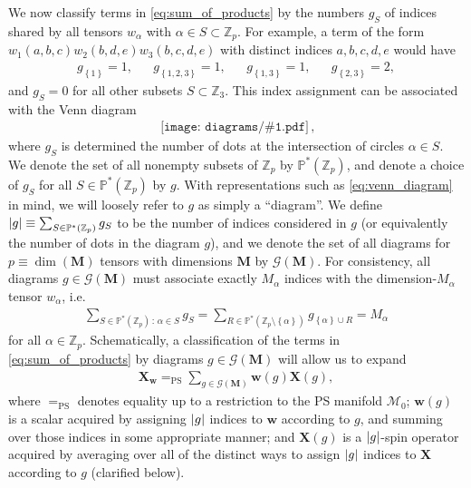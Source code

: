 \documentclass[nofootinbib,notitlepage,11pt]{revtex4-2}
\newcommand{\p}[1]{\left(#1\right)} %
\renewcommand{\set}[1]{\left\{#1\right\}} %
\newcommand{\m}{\bm} %
\newcommand{\1}{\mathds{1}}
\newcommand{\G}{\mathcal{G}}
\newcommand{\M}{\mathcal{M}}
\newcommand{\PP}{\mathbb{P}}
\newcommand{\ZZ}{\mathbb{Z}}
\newcommand{\EQPS}{=_{\text{PS}}}
\newcommand{\diagram}[1]
{\,\texttt{[image: diagrams/\#1.pdf]}\,}
\begin{document}
We now classify terms in \eqref{eq:sum_of_products} by the numbers
$g_S$ of indices shared by all tensors $w_\alpha$ with
$\alpha\in S\subset\ZZ_p$.  For example, a term of the form
$w_1\p{a,b,c} w_2\p{b,d,e} w_3\p{b,c,d,e}$ with distinct indices
$a,b,c,d,e$ would have
\begin{align}
  g_{\set{1}} = 1,
  &&
  g_{\set{1,2,3}} = 1,
  &&
  g_{\set{1,3}} = 1,
  &&
  g_{\set{2,3}} = 2,
\end{align}
and $g_S=0$ for all other subsets $S\subset\ZZ_3$.  This index
assignment can be associated with the Venn diagram
\begin{align}
  \diagram{example_123},
  \label{eq:venn_diagram}
\end{align}
where $g_S$ is determined the number of dots at the intersection of
circles $\alpha\in S$.  We denote the set of all nonempty subsets of
$\ZZ_p$ by $\PP^*\p{\ZZ_p}$, and denote a choice of $g_S$ for all
$S\in\PP^*\p{\ZZ_p}$ by $g$.  With representations such as
\eqref{eq:venn_diagram} in mind, we will loosely refer to $g$ as
simply a ``diagram''.  We define
$\abs{g}\equiv\sum_{S\in\PP^*\p{\ZZ_p}}g_S$ to be the number of
indices considered in $g$ (or equivalently the number of dots in the
diagram $g$), and we denote the set of all diagrams for
$p\equiv\dim\p{\m M}$ tensors with dimensions $\m M$ by $\G\p{\m M}$.
For consistency, all diagrams $g\in\G\p{\m M}$ must associate exactly
$M_\alpha$ indices with the dimension-$M_\alpha$ tensor $w_\alpha$,
i.e.
\begin{align}
  \sum_{S\in\PP^*\p{\ZZ_p}\,:\,\alpha\in S} g_S
  = \sum_{R\in\PP^*\p{\ZZ_p\setminus\set{\alpha}}} g_{\set{\alpha}\cup R}
  = M_\alpha
\end{align}
for all $\alpha\in\ZZ_p$.  Schematically, a classification of the
terms in \eqref{eq:sum_of_products} by diagrams $g\in\G\p{\m M}$ will
allow us to expand
\begin{align}
  \m X_{\m w} \EQPS \sum_{g\in\G\p{\m M}} \m w\p{g} \m X\p{g},
  \label{eq:sym_prod_teaser}
\end{align}
where $\EQPS$ denotes equality up to a restriction to the PS manifold
$\M_0$; $\m w\p{g}$ is a scalar acquired by assigning $\abs{g}$
indices to $\m w$ according to $g$, and summing over those indices in
some appropriate manner; and $\m X\p{g}$ is a $\abs{g}$-spin operator
acquired by averaging over all of the distinct ways to assign
$\abs{g}$ indices to $\m X$ according to $g$ (clarified below).
\end{document}
